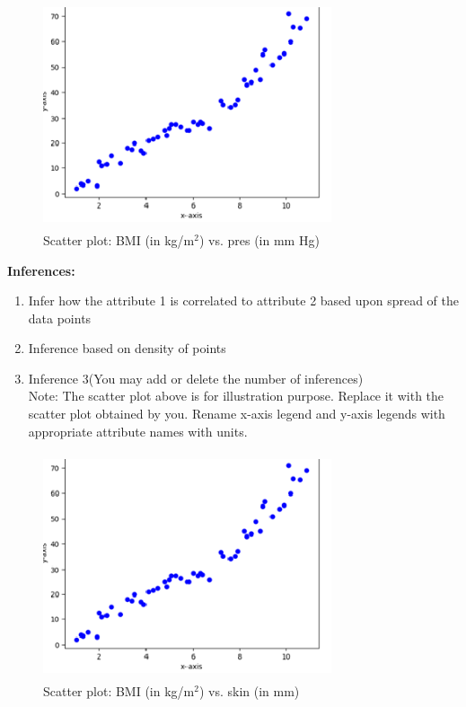 \documentclass[12 pt, a4paper]{article}
\theoremstyle{definition}
\begin{document}
\begin{figure}[H]
	\centering
	\includegraphics[width=8.5cm,height=6.65cm]{Scatter Plot.png}
	\caption{Scatter plot: BMI (in kg/m$^{2 }$) vs. pres (in mm Hg)}
	\label{Blockdia}
\end{figure}

\textbf{\Large Inferences:}
\begin{enumerate}
   \item Infer how the attribute 1 is correlated to attribute 2 based upon spread of the data points
   \item Inference based on density of points
   \item Inference 3(You may add or delete the number of inferences)
\\Note: The scatter plot above is for illustration purpose. Replace it with the scatter plot obtained by you. Rename x-axis legend and y-axis legends with appropriate attribute names with units.

\end{enumerate}

\begin{figure}[H]
	\centering
	\includegraphics[width=8.5cm,height=6.65cm]{Scatter Plot.png}
	\caption{Scatter plot: BMI (in kg/m$^{2 }$) vs. skin (in mm)}
	\label{Blockdia}
\end{figure}
\end{document}
